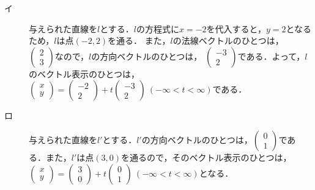 \documentclass[uplatex,dvipdfmx,a4paper,10pt,fleqn]{jsarticle}
\begin{document}
\begin{tleftbar}
	\begin{description}
        \item[イ] 
    与えられた直線を$l$とする．$l$の方程式に$x=-2$を代入すると，$y=2$となるため，$l$は点$(-2,2)$を通る．
	また，$l$の法線ベクトルのひとつは，
	$
		\begin{pmatrix}
			2 \\
			3
		\end{pmatrix}
		$なので，$l$の方向ベクトルのひとつは，
		$
		\begin{pmatrix}
			-3 \\
			2
		\end{pmatrix}
		$である．よって，$l$のベクトル表示のひとつは，
		$
		\begin{pmatrix}
			x \\
			y
		\end{pmatrix}
		= 
		\begin{pmatrix}
		-2 \\
		2
		\end{pmatrix}
		+t 
			\begin{pmatrix}
				-3 \\
				2
			\end{pmatrix}
			~(-\infty < t < \infty)$である．\\

			\item[ロ]
            与えられた直線を$l'$とする．$l '$の方向ベクトルのひとつは，$
				\begin{pmatrix}
					0 \\
					1
				\end{pmatrix}
			$である．また，$l '$は点$(3,0)$を通るので，そのベクトル表示のひとつは，
			$
				\begin{pmatrix}
					x \\
					y
				\end{pmatrix}
			= 
				\begin{pmatrix}
				3 \\
				0
				\end{pmatrix}
			+t 
				\begin{pmatrix}
					0 \\
					1
                    \end{pmatrix}
                     ~(-\infty < t < \infty)
				$となる．
                \end{description}
		\end{tleftbar}
		
\end{document}
